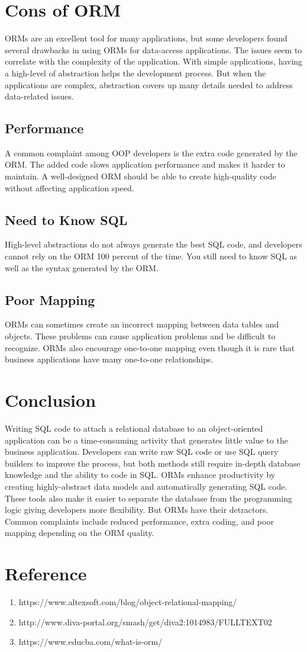 \documentclass[10pt,a4paper,twoside]{article}
\begin{document}
\section{Cons of ORM}
ORMs are an excellent tool for many applications, but some developers found several drawbacks in using ORMs for data-access applications. The issues seem to correlate with the complexity of the application. With simple applications, having a high-level of abstraction helps the development process. But when the applications are complex, abstraction covers up many details needed to address data-related issues.

\subsection{Performance}
A common complaint among OOP developers is the extra code generated by the ORM. The added code slows application performance and makes it harder to maintain. A well-designed ORM should be able to create high-quality code without affecting application speed.

\subsection{Need to Know SQL}
High-level abstractions do not always generate the best SQL code, and developers cannot rely on the ORM 100 percent of the time. You still need to know SQL as well as the syntax generated by the ORM.

\subsection{Poor Mapping}
ORMs can sometimes create an incorrect mapping between data tables and objects. These problems can cause application problems and be difficult to recognize. ORMs also encourage one-to-one mapping even though it is rare that business applications have many one-to-one relationships.


\section{Conclusion}
Writing SQL code to attach a relational database to an object-oriented application can be a time-consuming activity that generates little value to the business application. Developers can write raw SQL code or use SQL query builders to improve the process, but both methods still require in-depth database knowledge and the ability to code in SQL. ORMs enhance productivity by creating highly-abstract data models and automatically generating SQL code. These tools also make it easier to separate the database from the programming logic giving developers more flexibility. But ORMs have their detractors. Common complaints include reduced performance, extra coding, and poor mapping depending on the ORM quality.


\section{Reference}
\begin{enumerate}
\item https://www.altexsoft.com/blog/object-relational-mapping/
\item http://www.diva-portal.org/smash/get/diva2:1014983/FULLTEXT02
\item https://www.educba.com/what-is-orm/
\end{enumerate}
\end{document}
